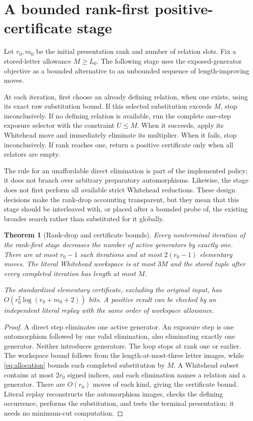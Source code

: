 \documentclass[11pt,letterpaper]{article}
\newtheorem{theorem}{Theorem}[section]
\theoremstyle{definition}\newtheorem{definition}[theorem]{Definition}
\begin{document}
\section{A bounded rank-first positive-certificate stage}\label{sec:rankfirst}
Let $r_0,m_0$ be the initial presentation rank and number of relation slots. Fix a stored-letter allowance $M\ge L_0$. The following stage uses the exposed-generator objective as a bounded alternative to an unbounded sequence of length-improving moves.

At each iteration, first choose an already defining relation, when one exists, using its exact raw substitution bound. If this selected substitution exceeds $M$, stop inconclusively. If no defining relation is available, run the complete one-step exposure selector with the constraint $U\le M$. When it succeeds, apply its Whitehead move and immediately eliminate its multiplier. When it fails, stop inconclusively. If rank reaches one, return a positive certificate only when all relators are empty.

The rule for an unaffordable direct elimination is part of the implemented policy; it does not branch over arbitrary preparatory automorphisms. Likewise, the stage does not first perform all available strict Whitehead reductions. These design decisions make the rank-drop accounting transparent, but they mean that this stage should be interleaved with, or placed after a bounded probe of, the existing broader search rather than substituted for it globally.

\begin{theorem}[Rank-drop and certificate bounds]\label{thm:rankdrops}
Every nonterminal iteration of the rank-first stage decreases the number of active generators by exactly one. There are at most $r_0-1$ such iterations and at most $2(r_0-1)$ elementary moves. The literal Whitehead workspace is at most $3M$ and the stored tuple after every completed iteration has length at most $M$.

The standardized elementary certificate, excluding the original input, has
$O(r_0^2\log(r_0+m_0+2))$ bits. A positive result can be checked by an independent literal replay with the same order of workspace allowance.
\end{theorem}
\begin{proof}
A direct step eliminates one active generator. An exposure step is one automorphism followed by one valid elimination, also eliminating exactly one generator. Neither introduces generators. The loop stops at rank one or earlier. The workspace bound follows from the length-at-most-three letter images, while \eqref{eq:allocation} bounds each completed substitution by $M$. A Whitehead subset contains at most $2r_0$ signed indices, and each elimination names a relation and a generator. There are $O(r_0)$ moves of each kind, giving the certificate bound. Literal replay reconstructs the automorphism images, checks the defining occurrence, performs the substitution, and tests the terminal presentation; it needs no minimum-cut computation.
\end{proof}
\end{document}
